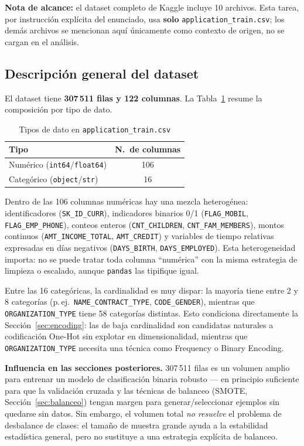 \documentclass[conference]{IEEEtran}
\begin{document}
\textbf{Nota de alcance:} el dataset completo de Kaggle incluye 10
archivos. Esta tarea, por instrucción explícita del enunciado, usa
\textbf{solo} \texttt{application\_train.csv}; los demás archivos se
mencionan aquí únicamente como contexto de origen, no se cargan en el
análisis.

\subsection{Descripción general del dataset}

El dataset tiene \textbf{307\,511 filas y 122 columnas}. La Tabla~\ref{tab:tipos}
resume la composición por tipo de dato.

\begin{table}[htbp]
\caption{Tipos de dato en \texttt{application\_train.csv}}
\label{tab:tipos}
\centering
\begin{tabular}{lc}
\toprule
Tipo & N.\ de columnas \\
\midrule
Numérico (\texttt{int64}/\texttt{float64}) & 106 \\
Categórico (\texttt{object}/\texttt{str})  & 16 \\
\bottomrule
\end{tabular}
\end{table}

Dentro de las 106 columnas numéricas hay una mezcla heterogénea:
identificadores (\texttt{SK\_ID\_CURR}), indicadores binarios 0/1
(\texttt{FLAG\_MOBIL}, \texttt{FLAG\_EMP\_PHONE}), conteos enteros
(\texttt{CNT\_CHILDREN}, \texttt{CNT\_FAM\_MEMBERS}), montos continuos
(\texttt{AMT\_INCOME\_TOTAL}, \texttt{AMT\_CREDIT}) y variables de tiempo
relativas expresadas en días negativos (\texttt{DAYS\_BIRTH},
\texttt{DAYS\_EMPLOYED}). Esta heterogeneidad importa: no se puede tratar
toda columna ``numérica'' con la misma estrategia de limpieza o escalado,
aunque \texttt{pandas} las tipifique igual.

Entre las 16 categóricas, la cardinalidad es muy dispar: la mayoría tiene
entre 2 y 8 categorías (p.\,ej.\ \texttt{NAME\_CONTRACT\_TYPE},
\texttt{CODE\_GENDER}), mientras que \texttt{ORGANIZATION\_TYPE} tiene 58
categorías distintas. Esto condiciona directamente la
Sección~\ref{sec:encoding}: las de baja cardinalidad son candidatas
naturales a codificación One-Hot sin explotar en dimensionalidad,
mientras que \texttt{ORGANIZATION\_TYPE} necesita una técnica como
Frequency o Binary Encoding.

\textbf{Influencia en las secciones posteriores.} 307\,511 filas es un
volumen amplio para entrenar un modelo de clasificación binaria robusto
--- en principio suficiente para que la validación cruzada y las técnicas
de balanceo (SMOTE, Sección~\ref{sec:balanceo}) tengan margen para
generar/seleccionar ejemplos sin quedarse sin datos. Sin embargo, el
volumen total \emph{no resuelve} el problema de desbalance de clases: el
tamaño de muestra grande ayuda a la estabilidad estadística general, pero
no sustituye a una estrategia explícita de balanceo.
\end{document}
